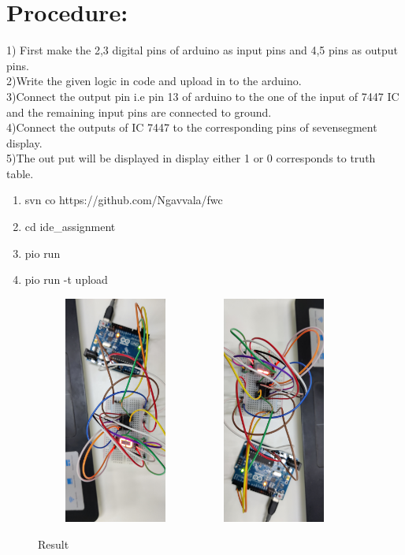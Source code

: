 \documentclass[letterpaper, 10 pt, conference]{ieeeconf}
\begin{document}
\section{Procedure:}
1) First make the 2,3 digital pins of arduino as input pins and 4,5 pins as output pins.
\\ 2)Write the given logic in code and upload in to the arduino.
\\3)Connect the output pin i.e pin 13 of arduino to the one of the input of 7447 IC and the remaining input pins are connected to ground.
\\ 4)Connect the outputs of IC 7447 to the corresponding pins of sevensegment display.
\\ 5)The out put will be displayed in display either 1 or 0 corresponds to truth table.
\vspace{5mm} %

\begin{enumerate}
\item svn co https://github.com/Ngavvala/fwc
\item cd ide\_assignment
\item pio run
\item pio run \--t upload

\end{enumerate}
\begin{figure}[ht]
\centering
\includegraphics[width=5.2cm, height=7.5cm, angle=90]{result1.jpg}
\includegraphics[width=5.2cm, height=7.5cm, angle=90]{result2.jpg}
\caption{Result}
\label{fig:result_picture}
\end{figure}
\end{document}
